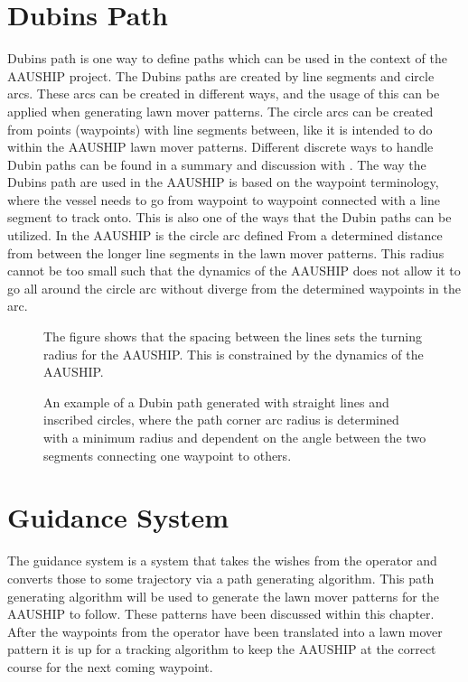 \section{Dubins Path}
Dubins path is one way to define paths which can be used in the
context of the AAUSHIP project. The Dubins paths are created by line
segments and circle arcs. These arcs can be created in different ways,
and the usage of this can be applied when generating lawn mover
patterns. The circle arcs can be created from points (waypoints) with
line segments between, like it is intended to do within the AAUSHIP
lawn mover patterns. Different discrete ways to handle Dubin paths can
be found in a summary and discussion with \citep{dubin}. The way the
Dubins path are used in the AAUSHIP is based on the waypoint
terminology, where the vessel needs to go from waypoint to waypoint
connected with a line segment to track onto. This is also one of the
ways that the Dubin paths can be utilized. In the AAUSHIP is the
circle arc defined From a determined distance from between the longer
line segments in the lawn mover patterns. This radius cannot be too
small such that the dynamics of the AAUSHIP does not allow it to go
all around the circle arc without diverge from the determined
waypoints in the arc.
\begin{figure}[htbp]
	\centering
	
	\caption{The figure shows that the spacing between the lines sets the turning radius for the AAUSHIP. This is constrained by the dynamics of the AAUSHIP.}
	\label{fig:lawnmoverturn}
\end{figure}


\begin{figure}[htbp]
	\centering
	
	\caption{An example of a Dubin path generated with straight lines and
		inscribed circles, where the path corner arc radius is determined
	with a minimum radius and dependent on the angle between the two
segments connecting one waypoint to others.}
\label{fig:normal_dubin_path}
\end{figure}


\section{Guidance System}
The guidance system is a system that takes the wishes from the
operator and converts those to some trajectory via a path generating
algorithm. This path generating algorithm will be used to generate the lawn mover patterns for the AAUSHIP to follow. These patterns have been discussed within this chapter. After the waypoints from the operator have been translated into a lawn mover pattern it is up for a tracking algorithm to keep the AAUSHIP at the correct course for the next coming waypoint.

